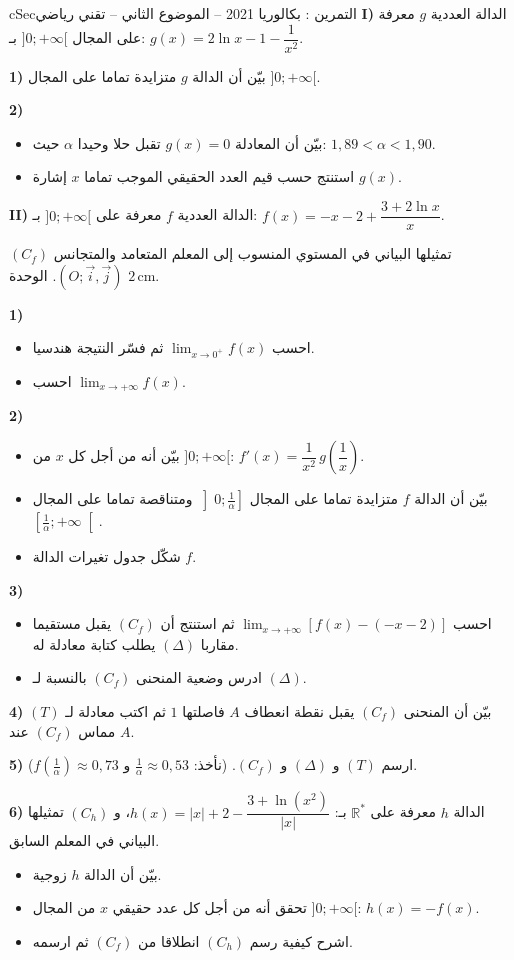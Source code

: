 \documentclass[12pt,a4paper]{article}
\newenvironment{BOX}[2]{\begin{otherlanguage}{english}\begin{arbox}{#1}{#2}}{\end{arbox}\end{otherlanguage}}
\newcounter{exo}
\newenvironment{tamrin}[1]{\stepcounter{exo}\begin{BOX}{cSec}{التمرين \theexo: #1}}{\end{BOX}}
\newcommand{\R}{\mathbb{R}}
\newenvironment{sq}{\begin{itemize}[leftmargin=2.4em,itemsep=3pt]}{\end{itemize}}
\newcommand{\qa}{\item[(أ)]}\newcommand{\qb}{\item[(ب)]}\newcommand{\qc}{\item[(جـ)]}\newcommand{\qd}{\item[(د)]}\newcommand{\qe}{\item[(هـ)]}
\begin{document}
\begin{tamrin}{بكالوريا 2021 -- الموضوع الثاني -- تقني رياضي}
\textbf{I)} الدالة العددية $g$ معرفة على المجال $]0;+\infty[$ بـ: $g(x)=2\ln x-1-\dfrac{1}{x^2}$.

\textbf{1)} بيّن أن الدالة $g$ متزايدة تماما على المجال $]0;+\infty[$.

\textbf{2)}
\begin{sq}
\qa بيّن أن المعادلة $g(x)=0$ تقبل حلا وحيدا $\alpha$ حيث: $1{,}89<\alpha<1{,}90$.
\qb استنتج حسب قيم العدد الحقيقي الموجب تماما $x$ إشارة $g(x)$.
\end{sq}
\textbf{II)} الدالة العددية $f$ معرفة على $]0;+\infty[$ بـ: $f(x)=-x-2+\dfrac{3+2\ln x}{x}$.

$(C_f)$ تمثيلها البياني في المستوي المنسوب إلى المعلم المتعامد والمتجانس $(O;\vec i,\vec j)$. الوحدة $2\,\text{cm}$.

\textbf{1)}
\begin{sq}
\qa احسب $\displaystyle\lim_{x\to0^+}f(x)$ ثم فسّر النتيجة هندسيا.
\qb احسب $\displaystyle\lim_{x\to+\infty}f(x)$.
\end{sq}
\textbf{2)}
\begin{sq}
\qa بيّن أنه من أجل كل $x$ من $]0;+\infty[$: $f'(x)=\dfrac{1}{x^2}\,g\left(\dfrac1x\right)$.
\qb بيّن أن الدالة $f$ متزايدة تماما على المجال $\left]0;\frac1\alpha\right]$ ومتناقصة تماما على المجال $\left[\frac1\alpha;+\infty\right[$.
\qc شكّل جدول تغيرات الدالة $f$.
\end{sq}
\textbf{3)}
\begin{sq}
\qa احسب $\displaystyle\lim_{x\to+\infty}\left[f(x)-(-x-2)\right]$ ثم استنتج أن $(C_f)$ يقبل مستقيما مقاربا $(\Delta)$ يطلب كتابة معادلة له.
\qb ادرس وضعية المنحنى $(C_f)$ بالنسبة لـ $(\Delta)$.
\end{sq}
\textbf{4)} بيّن أن المنحنى $(C_f)$ يقبل نقطة انعطاف $A$ فاصلتها $1$ ثم اكتب معادلة لـ $(T)$ مماس $(C_f)$ عند $A$.

\textbf{5)} ارسم $(T)$ و $(\Delta)$ و $(C_f)$. (نأخذ: $\frac1\alpha\approx0{,}53$ و $f\left(\frac1\alpha\right)\approx0{,}73$).

\textbf{6)} الدالة $h$ معرفة على $\R^*$ بـ: $h(x)=|x|+2-\dfrac{3+\ln(x^2)}{|x|}$، و $(C_h)$ تمثيلها البياني في المعلم السابق.
\begin{sq}
\qa بيّن أن الدالة $h$ زوجية.
\qb تحقق أنه من أجل كل عدد حقيقي $x$ من المجال $]0;+\infty[$: $h(x)=-f(x)$.
\qc اشرح كيفية رسم $(C_h)$ انطلاقا من $(C_f)$ ثم ارسمه.
\end{sq}
\end{tamrin}
\end{document}
